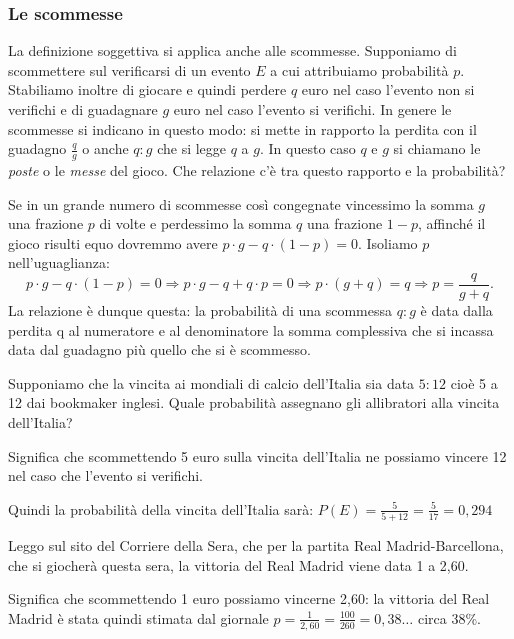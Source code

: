 \subsubsection*{Le scommesse}
La definizione soggettiva si applica anche alle scommesse. Supponiamo di 
scommettere sul verificarsi di un evento $E$ a cui attribuiamo probabilità $p$. 
Stabiliamo inoltre di giocare e quindi perdere $q$ euro nel caso l'evento non si 
verifichi e di guadagnare $g$ euro nel caso l'evento si verifichi. In genere le 
scommesse si indicano in questo modo: si mette in rapporto la perdita con il 
guadagno $\frac q g$ o anche $q:g$ che si legge $q$ a $g$. In questo caso $q$ e 
$g$ si chiamano le \emph{poste} o le \emph{messe} del gioco.
Che relazione c'è tra questo rapporto e la probabilità?

Se in un grande numero di scommesse così congegnate vincessimo la somma $g$ una 
frazione $p$ di volte e perdessimo la somma $q$ una frazione $1-p$, affinché il 
gioco risulti equo dovremmo avere $p\cdot g-q\cdot (1-p)=0$. Isoliamo $p$ 
nell'uguaglianza:
\begin{equation*}
p\cdot g-q\cdot (1-p)=0 \Rightarrow p\cdot g-q+q\cdot p=0\Rightarrow p\cdot 
(g+q)=q \Rightarrow p=\frac q{g+q}.
\end{equation*}
La relazione è dunque questa: la probabilità di una scommessa $q:g$ è data dalla 
perdita q al numeratore e al denominatore la somma complessiva che si incassa 
data dal guadagno più quello che si è scommesso.


\begin{exrig}
\begin{esempio}
Supponiamo che la vincita ai mondiali di calcio dell'Italia sia data $5:12$ cioè 
5 a 12 dai bookmaker inglesi. Quale probabilità assegnano gli allibratori alla 
vincita dell'Italia?

Significa che scommettendo 5 euro sulla vincita dell'Italia ne possiamo vincere 
12 nel caso che l'evento si verifichi.

Quindi la probabilità della vincita dell'Italia sarà:
$P(E)=\frac 5{5+12}=\frac 5{17}=0,294$
\end{esempio}

\begin{esempio}
Leggo sul sito del Corriere della Sera, che per la partita Real 
Madrid-Barcellona, che si giocherà questa sera, la vittoria del Real Madrid 
viene data 1 a 2,60.

Significa che scommettendo 1 euro possiamo vincerne 2,60: la vittoria del Real 
Madrid è stata quindi stimata dal giornale $p=\frac 
1{2,60}=\frac{100}{260}=0,38\ldots$ circa 38\%.
\end{esempio}
\end{exrig}

